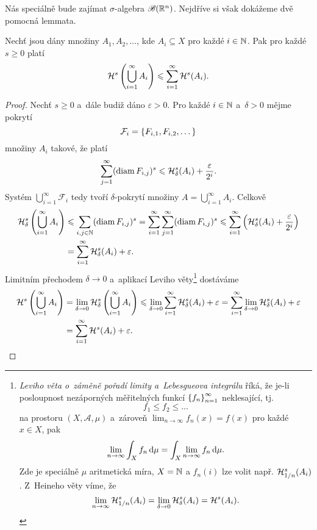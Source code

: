 Nás speciálně bude zajímat $\sigma$-algebra $\borelsigmaalgebra(\R^n)$. Nejdříve si však dokážeme dvě pomocná lemmata.
\begin{lemma}\label{lem:Hausdorffova-mira-subaditivita}
    Nechť jsou dány množiny $A_1,A_2,\ldots$, kde $A_i\subseteq X$ pro každé $i\in\N$. Pak pro každé $s\geqslant 0$ platí
    \[\hausdorffmeasure{s}\left(\bigcup_{i=1}^\infty A_i\right)\leqslant\sum_{i=1}^{\infty}\hausdorffmeasure{s}(A_i).\]
\end{lemma}
\begin{proof}
    Nechť $s\geqslant 0$ a~dále budiž dáno $\varepsilon>0$. Pro každé $i\in\N$ a~$\delta>0$ mějme pokrytí
    \[\mathcal{F}_i=\set{F_{i,1},F_{i,2},\dots}\]
    množiny $A_i$ takové, že platí
    \[\sum_{j=1}^{\infty}(\diam{F_{i,j}})^s\leqslant\hausdorffdeltameasure{s}{\delta}(A_i)+\dfrac{\varepsilon}{2^i}.\]
    Systém $\bigcup_{i=1}^\infty\mathcal{F}_i$ tedy tvoří $\delta$-pokrytí množiny $A=\bigcup_{i=1}^\infty A_i$. Celkově
    \begin{align*}
        \hausdorffdeltameasure{s}{\delta}\left(\bigcup_{i=1}^\infty A_i\right)&\leqslant\sum_{i,j\in\N}(\diam{F_{i,j}})^s=\sum_{i=1}^{\infty}\sum_{j=1}^{\infty}(\diam{F_{i,j}})^s\leqslant\sum_{i=1}^{\infty}\left(\hausdorffdeltameasure{s}{\delta}(A_i)+\dfrac{\varepsilon}{2^i}\right)\\
        &=\sum_{i=1}^{\infty}\hausdorffdeltameasure{s}{\delta}(A_i)+\varepsilon.
    \end{align*}
    Limitním přechodem $\delta\to 0$ a~aplikací Leviho věty\footnote{\emph{Leviho věta o~záměně pořadí limity a~Lebesgueova integrálu} říká, že je-li posloupnost nezáporných měřitelných funkcí $\set{f_n}_{n=1}^\infty$ neklesající, tj.
    \[f_1\leqslant f_2\leqslant\dots\]
    na prostoru $(X,\mathcal{A},\mu)$ a~zároveň $\lim_{n\to\infty}f_n(x)=f(x)$ pro každé $x\in X$, pak
    \[\lim_{n\to\infty}\int_X f_n\dx[\mu]=\int_X \lim_{n\to\infty}f_n\dx[\mu].\]
    Zde je speciálně $\mu$ aritmetická míra, $X=\N$ a $f_n(i)$ lze volit např. $\hausdorffdeltameasure{s}{1/n}(A_i)$. Z~Heineho věty víme, že
    \[\lim_{n\to\infty}\hausdorffdeltameasure{s}{1/n}(A_i)=\lim_{\delta\to 0}\hausdorffdeltameasure{s}{\delta}(A_i)=\hausdorffmeasure{s}(A_i).\]
    }
    dostáváme
    \begin{align*}
        \hausdorffmeasure{s}\left(\bigcup_{i=1}^\infty A_i\right)&=\lim_{\delta\to 0}\hausdorffdeltameasure{s}{\delta}\left(\bigcup_{i=1}^\infty A_i\right)\leqslant\lim_{\delta\to 0}\sum_{i=1}^{\infty}\hausdorffdeltameasure{s}{\delta}(A_i)+\varepsilon=\sum_{i=1}^{\infty}\lim_{\delta\to 0}\hausdorffdeltameasure{s}{\delta}(A_i)+\varepsilon\\
        &=\sum_{i=1}^{\infty}\hausdorffmeasure{s}(A_i)+\varepsilon.
    \end{align*} 
\end{proof}
